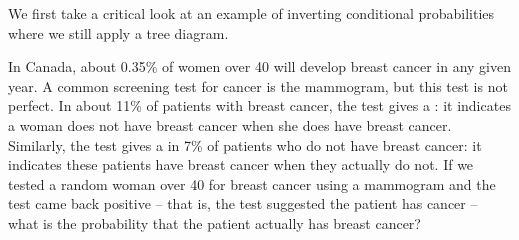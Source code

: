 We first take a critical look at an example of inverting conditional probabilities where we still apply a tree diagram.

\D{\newpage}

\begin{examplewrap}
\begin{nexample}{In Canada, about 0.35\% of women over 40
    will develop breast cancer in any given year.
    A common screening test for cancer is the mammogram,
    but this test is not perfect.
    In about 11\% of patients with breast cancer, the test
    gives a :
    it indicates a woman does not have breast cancer when
    she does have breast cancer.
    Similarly, the test gives a 
    in 7\% of patients who do not have breast cancer:
    it indicates these patients have breast cancer when
    they actually do not.
    If we tested a random woman over 40 for breast cancer
    using a mammogram and the test came back positive
    -- that is, the test suggested the patient has cancer --
    what is the probability that the patient actually has
    breast cancer?}

\label{probBreastCancerGivenPositiveTestExample}


\end{nexample}
\end{examplewrap}
